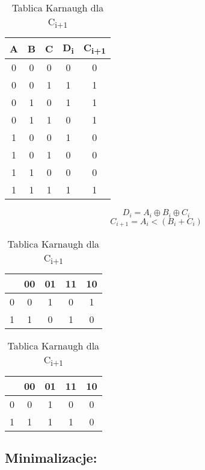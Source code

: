 \documentclass[12pt,a4paper]{article}
\begin{document}
			\begin{table}[h]
				\begin{minipage}{.5\textwidth}
					\caption{Tabela Prawdy}
					\vspace{0.2cm}
					\centering
					\begin{tabular}{ccc|c|c}
						A&B&C&D\textsubscript{i}&C\textsubscript{i+1}\\\hline
						0&0&0&0&0\\
						0&0&1&1&1\\
						0&1&0&1&1\\
						0&1&1&0&1\\\hline
						1&0&0&1&0\\
						1&0&1&0&0\\
						1&1&0&0&0\\
						1&1&1&1&1\\
					\end{tabular}
					\begin{displaymath}
					D_i = A_i \oplus B_i \oplus C_i
					\end{displaymath}
					\begin{displaymath}
					C_{i+1} = A_i < (B_i + C_i)
					\end{displaymath}
				\end{minipage}%
				\begin{minipage}{.5\textwidth}
					\caption{Tablica Karnaugh dla D\textsubscript{i}}
					\vspace{0.2cm}
					\centering
					\begin{tabular}{c|c|c|c|c}
						\backslashbox{C}{AB}&00&01&11&10\\\hline
						0&0&1&0&1\\\hline
						1&1&0&1&0\\
					\end{tabular}
					\vspace{0.4cm}
					\caption{Tablica Karnaugh dla C\textsubscript{i+1}}
					\vspace{0.2cm}
					\centering
					\begin{tabular}{c|c|c|c|c}
						\backslashbox{C}{AB}&00&01&11&10\\\hline
						0&0&1&0&0\\\hline
						1&1&1&1&0\\
					\end{tabular} 
				\end{minipage} 
			\end{table}
				
		\subsection{Minimalizacje:}
			
\end{document}
